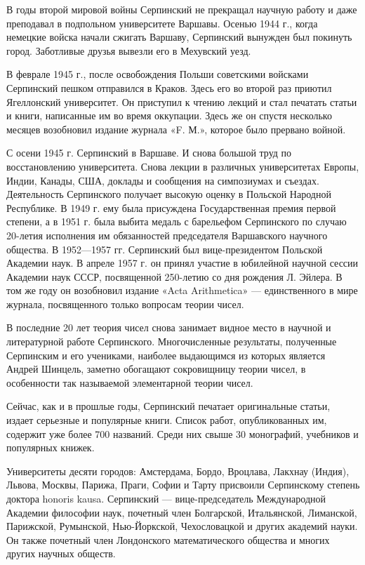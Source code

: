 \documentclass[12pt, a4paper, openany]{book}
\begin{document}
В годы второй мировой войны Серпинский не прекращал научную работу и даже преподавал в подпольном университете Варшавы. Осенью 1944 г., когда немецкие войска начали сжигать Варшаву, Серпинский вынужден был покинуть город. Заботливые друзья вывезли его в Мехувский уезд.

В феврале 1945 г., после освобождения Польши советскими войсками Серпинский пешком отправился в Краков. Здесь его во второй раз приютил Ягеллонский университет. Он приступил к чтению лекций и стал печатать статьи и книги, написанные им во время оккупации. Здесь же он спустя несколько месяцев возобновил издание журнала «F. М.», которое было прервано войной.

С осени 1945 г. Серпинский в Варшаве. И снова большой труд по восстановлению университета. Снова лекции в различных университетах Европы, Индии, Канады, США, доклады и сообщения на симпозиумах и съездах. Деятельность Серпинского получает высокую оценку в Польской Народной Республике. В 1949 г. ему была присуждена Государственная премия первой степени, а в 1951 г. была выбита медаль с барельефом Серпинского по случаю 20-летия исполнения им обязанностей председателя Варшавского научного общества. В 1952—1957 гг. Серпинский был вице-президентом Польской Академии наук. В апреле 1957 г. он принял участие в юбилейной научной сессии Академии наук СССР, посвященной 250-летию со дня рождения Л. Эйлера. В том же году он возобновил издание «Acta Arithmetica» — единственного в мире журнала, посвященного только вопросам теории чисел.

В последние 20 лет теория чисел снова занимает видное место в научной и литературной работе Серпинского. Многочисленные результаты, полученные Серпинским и его учениками, наиболее выдающимся из которых является Андрей Шинцель, заметно обогащают сокровищницу теории чисел, в особенности так называемой элементарной теории чисел.

Сейчас, как и в прошлые годы, Серпинский печатает оригинальные статьи, издает серьезные и популярные книги. Список работ, опубликованных им, содержит уже более 700 названий. Среди них свыше 30 монографий, учебников и популярных книжек.

Университеты десяти городов: Амстердама, Бордо, Вроцлава, Лакхнау (Индия), Львова, Москвы, Парижа, Праги, Софии и Тарту присвоили Серпинскому степень доктора honoris kausa. Серпинский — вице-председатель Международной Академии философии наук, почетный член Болгарской, Итальянской, Лиманской, Парижской, Румынской, Нью-Йоркской, Чехословацкой и других академий науки. Он также почетный член Лондонского математического общества и многих других научных обществ.
\end{document}
